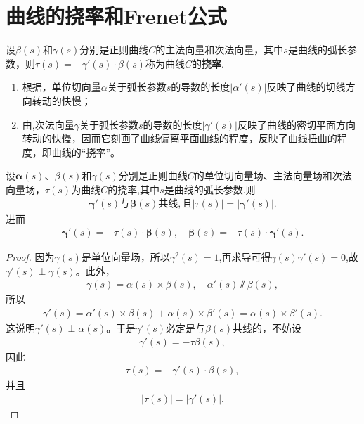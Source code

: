 \documentclass[../../main.tex]{subfiles}%
\begin{document}
\section{曲线的挠率和Frenet公式}

\begin{definition}
设$\beta(s)$和$\gamma(s)$分别是正则曲线$C$的主法向量和次法向量，其中$s$是曲线的弧长参数，则$\tau(s) = -\gamma'(s) \cdot \beta(s)$称为曲线$C$的\textbf{挠率}.
\end{definition}
\begin{remark}
\begin{enumerate}
\item 根据，单位切向量$\alpha$关于弧长参数$s$的导数的长度$|\alpha'(s)|$反映了曲线的切线方向转动的快慢；

\item 由,次法向量$\gamma$关于弧长参数$s$的导数的长度$|\gamma'(s)|$反映了曲线的密切平面方向转动的快慢，因而它刻画了曲线偏离平面曲线的程度，反映了曲线扭曲的程度，即曲线的“挠率”。
\end{enumerate}

\end{remark}

\begin{proposition}\label{proposition:挠率的基本性质}
设$\bm{\alpha}(s)$、$\beta(s)$和$\gamma(s)$分别是正则曲线$C$的单位切向量场、主法向量场和次法向量场，$\tau(s)$为曲线$C$的挠率,其中$s$是曲线的弧长参数.则
\begin{align*}
\boldsymbol{\gamma}'\left( s \right) \text{与}\boldsymbol{\beta }\left( s \right) \text{共线},\text{且}|\tau(s)| = |\bm{\gamma}'(s)|. 
\end{align*}
进而
\begin{align*}
\bm{\gamma}'(s)=-\tau(s)\cdot \bm{\beta}(s),\quad \bm{\beta}(s)=-\tau(s)\cdot \bm{\gamma}'(s).
\end{align*}
\end{proposition}
\begin{proof}

因为$\gamma(s)$是单位向量场，所以$\gamma^2(s)=1$,再求导可得$\gamma(s)\gamma'(s)=0$,故$\gamma'(s) \perp \gamma(s)$。此外，
\begin{align*}
\gamma(s) = \alpha(s) \times \beta(s), \quad \alpha'(s) \varparallel  \beta(s),
\end{align*}
所以
\begin{align*}
\gamma'(s) = \alpha'(s) \times \beta(s) + \alpha(s) \times \beta'(s) = \alpha(s) \times \beta'(s).
\end{align*}
这说明$\gamma'(s) \perp \alpha(s)$。于是$\gamma'(s)$必定是与$\beta(s)$共线的，不妨设
\begin{align*}
\gamma'(s) = -\tau \beta(s),
\end{align*}
因此
\begin{align*}
\tau(s) = -\gamma'(s) \cdot \beta(s), 
\end{align*}
并且
\begin{align*}
|\tau(s)| = |\gamma'(s)|. 
\end{align*}

\end{proof}
\end{document}
